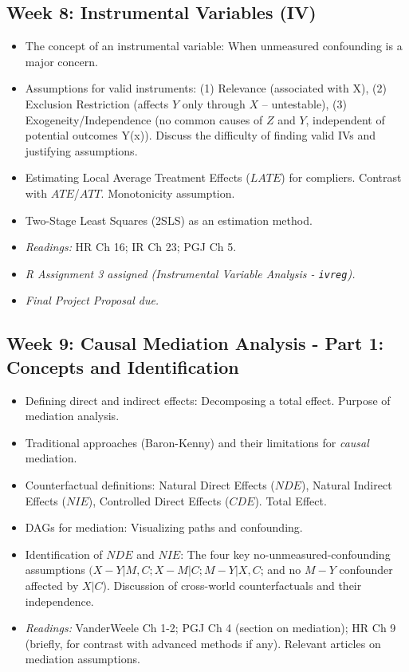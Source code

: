 \documentclass[10.5pt]{article}
\begin{document}
\subsection*{Week 8: Instrumental Variables (IV)}
\begin{itemize}
    \item The concept of an instrumental variable: When unmeasured confounding is a major concern.
    \item Assumptions for valid instruments: (1) Relevance (associated with X), (2) Exclusion Restriction (affects $Y$ only through $X$ – untestable), (3) Exogeneity/Independence (no common causes of $Z$ and $Y$, independent of potential outcomes Y(x)). Discuss the difficulty of finding valid IVs and justifying assumptions.
    \item Estimating Local Average Treatment Effects ($LATE$) for compliers. Contrast with $ATE$/$ATT$. Monotonicity assumption.
    \item Two-Stage Least Squares (2SLS) as an estimation method.
    \item \textit{Readings:} HR Ch 16; IR Ch 23; PGJ Ch 5.
    \item \textit{R Assignment 3 assigned (Instrumental Variable Analysis - \texttt{ivreg}).}
    \item \textit{Final Project Proposal due.}
\end{itemize}

\subsection*{Week 9: Causal Mediation Analysis - Part 1: Concepts and Identification}
\begin{itemize}
    \item Defining direct and indirect effects: Decomposing a total effect. Purpose of mediation analysis.
    \item Traditional approaches (Baron-Kenny) and their limitations for \textit{causal} mediation.
    \item Counterfactual definitions: Natural Direct Effects ($NDE$), Natural Indirect Effects ($NIE$), Controlled Direct Effects ($CDE$). Total Effect.
    \item DAGs for mediation: Visualizing paths and confounding.
    \item Identification of $NDE$ and $NIE$: The four key no-unmeasured-confounding assumptions $(X-Y | M,C; X-M | C; M-Y | X,C$; and no $M-Y$ confounder affected by $X | C$). Discussion of cross-world counterfactuals and their independence.
    \item \textit{Readings:} VanderWeele Ch 1-2; PGJ Ch 4 (section on mediation); HR Ch 9 (briefly, for contrast with advanced methods if any). Relevant articles on mediation assumptions.
\end{itemize}
\end{document}
